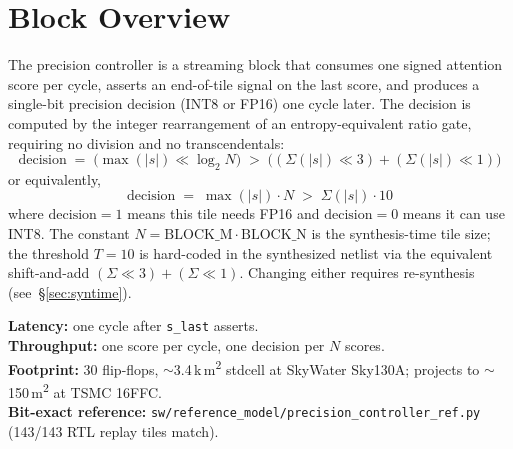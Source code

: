\documentclass[11pt]{article}
\begin{document}
\tableofcontents
\clearpage

\section{Block Overview}
\label{sec:overview}

The precision controller is a streaming block that consumes one signed
attention score per cycle, asserts an end-of-tile signal on the last score,
and produces a single-bit precision decision (INT8 or FP16) one cycle later.
The decision is computed by the integer rearrangement of an entropy-equivalent
ratio gate, requiring no division and no transcendentals:
\begin{equation*}
\mathrm{decision} \;=\; \bigl(\max(|s|) \ll \log_2 N\bigr) \;>\;
\bigl((\Sigma(|s|) \ll 3) + (\Sigma(|s|) \ll 1)\bigr)
\end{equation*}
or equivalently,
\begin{equation*}
\mathrm{decision} \;=\; \max(|s|) \cdot N \;>\; \Sigma(|s|) \cdot 10
\end{equation*}
where $\mathrm{decision} = 1$ means this tile needs FP16 and
$\mathrm{decision} = 0$ means it can use INT8. The constant $N = \mathrm{BLOCK\_M}
\cdot \mathrm{BLOCK\_N}$ is the synthesis-time tile size; the threshold $T = 10$
is hard-coded in the synthesized netlist via the equivalent shift-and-add
$(\Sigma \ll 3) + (\Sigma \ll 1)$. Changing either requires re-synthesis
(see~\S\ref{sec:syntime}).

\medskip
\noindent\textbf{Latency:} one cycle after \texttt{s\_last} asserts.\\
\textbf{Throughput:} one score per cycle, one decision per $N$ scores.\\
\textbf{Footprint:} 30 flip-flops, $\sim$3.4\,k\,\textmu m\textsuperscript{2} stdcell at
SkyWater Sky130A; projects to $\sim$150\,\textmu m\textsuperscript{2} at TSMC 16FFC.\\
\textbf{Bit-exact reference:} \texttt{sw/reference\_model/precision\_controller\_ref.py}
(143/143 RTL replay tiles match).

\end{document}
